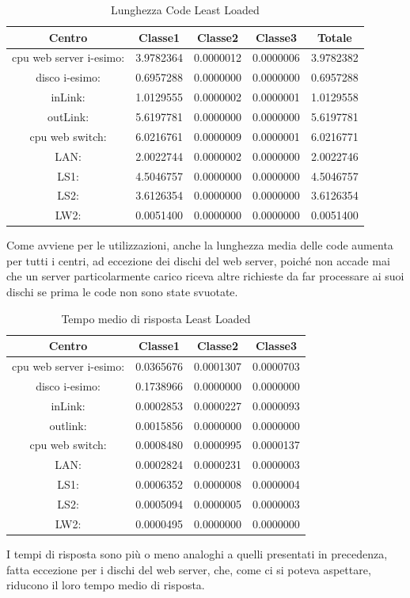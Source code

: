 \begin{table}[H]
\begin{center}
\begin{tabular}{||c|c|c|c|c||}
\hline
Centro &Classe1 &Classe2 &Classe3 &Totale\\
\hline
\hline
 cpu web server i-esimo: 	&3.9782364	&0.0000012	&0.0000006	&3.9782382\\
\hline
 disco i-esimo: 	&0.6957288	&0.0000000	&0.0000000	&0.6957288\\
\hline
 inLink: 	&1.0129555	&0.0000002	&0.0000001	&1.0129558\\
\hline
 outLink: 	&5.6197781	&0.0000000	&0.0000000	&5.6197781\\
\hline
 cpu web switch: 	&6.0216761	&0.0000009	&0.0000001	&6.0216771\\
\hline
 LAN: 	&2.0022744	&0.0000002	&0.0000000	&2.0022746\\
\hline
 LS1: 	&4.5046757	&0.0000000	&0.0000000	&4.5046757\\
\hline
 LS2: 	&3.6126354	&0.0000000	&0.0000000	&3.6126354\\
\hline
 LW2: 	&0.0051400	&0.0000000	&0.0000000	&0.0051400\\
\hline
\end{tabular}
\end{center}
\caption{Lunghezza Code Least Loaded}
\label{lunghezzacode}
\end{table}
Come avviene per le utilizzazioni, anche la lunghezza media delle code aumenta per tutti i centri, ad eccezione dei dischi del web server, poiché non accade mai che un server particolarmente carico riceva altre richieste da far processare ai suoi dischi se prima le code non sono state svuotate.
\begin{table}[H]
\begin{center}
\begin{tabular}{||c|c|c|c||}
\hline
Centro &Classe1 &Classe2 &Classe3\\
\hline
\hline
 cpu web server i-esimo: 	&0.0365676	&0.0001307	&0.0000703\\
\hline
 disco i-esimo: 	&0.1738966	&0.0000000	&0.0000000\\
\hline
 inLink: 	&0.0002853	&0.0000227	&0.0000093\\
\hline
 outlink: 	&0.0015856	&0.0000000	&0.0000000\\
\hline
 cpu web switch: 	&0.0008480	&0.0000995	&0.0000137\\
\hline
 LAN: 	&0.0002824	&0.0000231	&0.0000003\\
\hline
 LS1: 	&0.0006352	&0.0000008	&0.0000004\\
\hline
 LS2: 	&0.0005094	&0.0000005	&0.0000003\\
\hline
 LW2: 	&0.0000495	&0.0000000	&0.0000000\\
\hline
\end{tabular}
\end{center}
\caption{Tempo medio di risposta Least Loaded}
\label{tempomediodirisposta}
\end{table}
I tempi di risposta sono più o meno analoghi a quelli presentati in precedenza, fatta eccezione per i dischi del web server, che, come ci si poteva aspettare, riducono il loro tempo medio di risposta.
